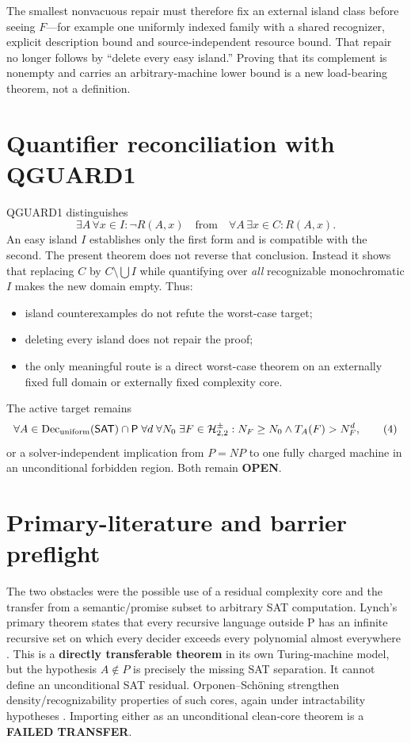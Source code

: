 \documentclass[11pt]{article}
\newcommand{\OPEN}{\textbf{OPEN}}
\newcommand{\SAT}{\mathsf{SAT}}
\newcommand{\Htwo}{\mathcal H^{\pm}_{2,2}}
\begin{document}
The smallest nonvacuous repair must therefore fix an external island class
before seeing $F$---for example one uniformly indexed family with a shared
recognizer, explicit description bound and source-independent resource bound.
That repair no longer follows by ``delete every easy island.''  Proving that
its complement is nonempty and carries an arbitrary-machine lower bound is a
new load-bearing theorem, not a definition.

\section{Quantifier reconciliation with QGUARD1}

QGUARD1 distinguishes
\[
 \exists A\,\forall x\in I:\neg R(A,x)
 \quad\text{from}\quad
 \forall A\,\exists x\in C:R(A,x).                      \tag{3}
\]
An easy island $I$ establishes only the first form and is compatible with the
second.  The present theorem does not reverse that conclusion.  Instead it
shows that replacing $C$ by $C\setminus\bigcup I$ while quantifying over
\emph{all} recognizable monochromatic $I$ makes the new domain empty.  Thus:
\begin{itemize}
\item island counterexamples do not refute the worst-case target;
\item deleting every island does not repair the proof;
\item the only meaningful route is a direct worst-case theorem on an
externally fixed full domain or externally fixed complexity core.
\end{itemize}

The active target remains
\[
 \forall A\in\operatorname{Dec}_{\rm uniform}(\SAT)\cap\mathsf P\;
 \forall d\;\forall N_0\;\exists F\in\Htwo:
 N_F\ge N_0\land T_A(F)>N_F^d,                           \tag{4}
\]
or a solver-independent implication from $P=NP$ to one fully charged machine
in an unconditional forbidden region.  Both remain \OPEN.

\section{Primary-literature and barrier preflight}

The two obstacles were the possible use of a residual complexity core and
the transfer from a semantic/promise subset to arbitrary SAT computation.
Lynch's primary theorem states that every recursive language outside P has an
infinite recursive set on which every decider exceeds every polynomial almost
everywhere \cite{lynch}.  This is a \textbf{directly transferable theorem} in
its own Turing-machine model, but the hypothesis $A\notin P$ is precisely the
missing SAT separation.  It cannot define an unconditional SAT residual.
Orponen--Sch\"oning strengthen density/recognizability properties of such
cores, again under intractability hypotheses \cite{os}.  Importing either as
an unconditional clean-core theorem is a \textbf{FAILED TRANSFER}.
\end{document}
